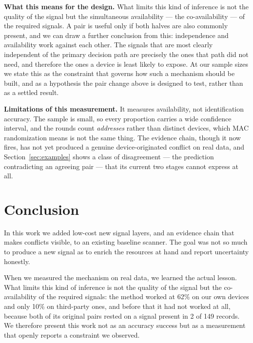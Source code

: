 \documentclass[conference]{IEEEtran}
\begin{document}
\textbf{What this means for the design.} What limits this kind of inference is
not the quality of the signal but the simultaneous availability
--- the co-availability --- of the required signals. A pair is useful only if
both halves are also commonly present, and we can draw a further conclusion
from this: independence and availability work against each other. The signals
that are most clearly independent of the primary decision path are precisely
the ones that path did not need, and therefore the ones a device is least
likely to expose. At our sample sizes we state this as the constraint that
governs how such a mechanism should be built, and as a hypothesis the pair
change above is designed to test, rather than as a settled result.

\textbf{Limitations of this measurement.} It measures availability, not
identification accuracy. The sample is small, so every proportion carries a
wide confidence interval, and the rounds count \emph{addresses} rather than
distinct devices, which MAC randomization means is not the same thing. The
evidence chain, though it now fires, has not yet produced a genuine
device-originated conflict on real data, and Section~\ref{sec:examples} shows
a class of disagreement --- the prediction contradicting an agreeing pair ---
that its current two stages cannot express at all.

\section{Conclusion}\label{sec:conclusion}
In this work we added low-cost new signal layers, and an evidence chain that
makes conflicts visible, to an existing baseline scanner. The goal was not so
much to produce a new signal as to enrich the resources at hand and report
uncertainty honestly.

When we measured the mechanism on real data, we learned the actual lesson.
What limits this kind of inference is not the quality of the signal but the
co-availability of the required signals: the method worked at 62\% on our own
devices and only 10\% on third-party ones, and before that it had not worked
at all, because both of its original pairs rested on a signal present in 2 of
149 records. We therefore present this work not as an accuracy success but as
a measurement that openly reports a constraint we observed.
\end{document}
